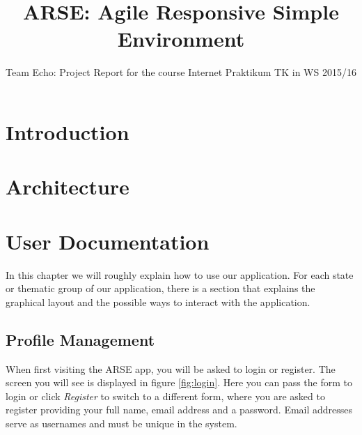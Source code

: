 \documentclass[
	accentcolor=tud1a %
]{tudreport}
\begin{document}
\title{ARSE: Agile Responsive Simple Environment}
\subtitle{Team Echo: Project Report for the course Internet Praktikum TK in WS 2015/16}

\maketitle

\tableofcontents

\chapter{Introduction}
\label{ch:introduction}

\blindtext

\chapter{Architecture}
\label{ch:architecture}

\chapter{User Documentation}
\label{ch:use-documentation}

In this chapter we will roughly explain how to use our application. For each state or thematic group of our application, there is a section that explains the graphical layout and the possible ways to interact with the application.



\section{Profile Management}
\label{sec:profile-mgmt}

When first visiting the ARSE app, you will be asked to login or register. The screen you will see is displayed in figure \ref{fig:login}. Here you can pass the form to login or click \emph{Register} to switch to a different form, where you are asked to register providing your full name, email address and a password. Email addresses serve as usernames and must be unique in the system.
\end{document}
